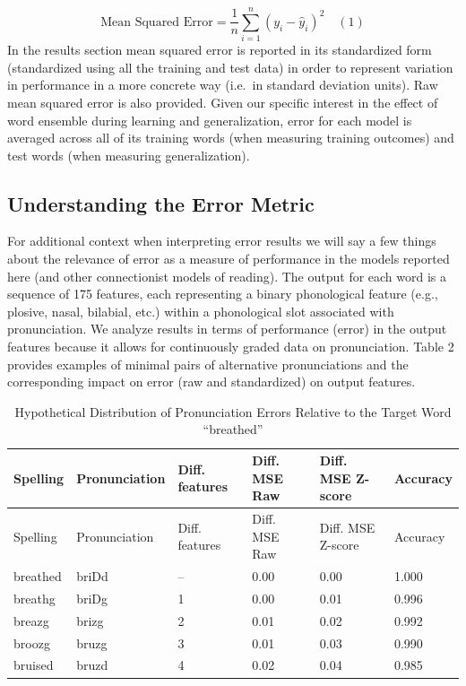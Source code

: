 \documentclass[
  ,man,floatsintext]{apa6}
\begin{document}
\[
\text{Mean Squared Error} = \frac{1}{n} \sum_{i=1}^{n} (y_i - \hat{y}_i)^2
\quad (1) 
\]
In the results section mean squared error is reported in its standardized form (standardized using all the training and test data) in order to represent variation in performance in a more concrete way (i.e.~in standard deviation units). Raw mean squared error is also provided. Given our specific interest in the effect of word ensemble during learning and generalization, error for each model is averaged across all of its training words (when measuring training outcomes) and test words (when measuring generalization).

\hypertarget{understanding-the-error-metric}{%
\subsection{Understanding the Error Metric}\label{understanding-the-error-metric}}

For additional context when interpreting error results we will say a few things about the relevance of error as a measure of performance in the models reported here (and other connectionist models of reading). The output for each word is a sequence of 175 features, each representing a binary phonological feature (e.g., plosive, nasal, bilabial, etc.) within a phonological slot associated with pronunciation. We analyze results in terms of performance (error) in the output features because it allows for continuously graded data on pronunciation. Table 2 provides examples of minimal pairs of alternative pronunciations and the corresponding impact on error (raw and standardized) on output features.

\begin{longtable}[]{@{}llllll@{}}
\caption{\label{tab:table2} Hypothetical Distribution of Pronunciation Errors Relative to the Target Word ``breathed''}\tabularnewline
\toprule\noalign{}
Spelling & Pronunciation & Diff. features & Diff. MSE Raw & Diff. MSE Z-score & Accuracy \\
\midrule\noalign{}
\endfirsthead
\toprule\noalign{}
Spelling & Pronunciation & Diff. features & Diff. MSE Raw & Diff. MSE Z-score & Accuracy \\
\midrule\noalign{}
\endhead
\bottomrule\noalign{}
\endlastfoot
breathed & briDd & -- & 0.00 & 0.00 & 1.000 \\
breathg & briDg & 1 & 0.00 & 0.01 & 0.996 \\
breazg & brizg & 2 & 0.01 & 0.02 & 0.992 \\
broozg & bruzg & 3 & 0.01 & 0.03 & 0.990 \\
bruised & bruzd & 4 & 0.02 & 0.04 & 0.985 \\
\end{longtable}
\end{document}
